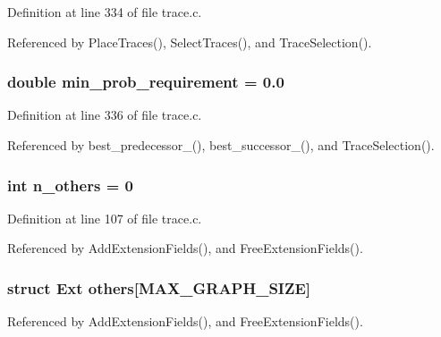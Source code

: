 Definition at line 334 of file trace.c.

Referenced by Place\-Traces(), Select\-Traces(), and Trace\-Selection().
\subsubsection{\setlength{\rightskip}{0pt plus 5cm}double \bf{min\_\-prob\_\-requirement} = 0.0\hspace{0.3cm}{\tt  [static]}}\label{trace_8c_06a8a0cdd51ec843aa04ed331c8cca8e}




Definition at line 336 of file trace.c.

Referenced by best\_\-predecessor\_(), best\_\-successor\_(), and Trace\-Selection().
\subsubsection{\setlength{\rightskip}{0pt plus 5cm}int \bf{n\_\-others} = 0\hspace{0.3cm}{\tt  [static]}}\label{trace_8c_345739fa850c0585c546cf18d1321dfd}




Definition at line 107 of file trace.c.

Referenced by Add\-Extension\-Fields(), and Free\-Extension\-Fields().
\subsubsection{\setlength{\rightskip}{0pt plus 5cm}struct \bf{Ext}
 \bf{others}[MAX\_\-GRAPH\_\-SIZE]\hspace{0.3cm}{\tt  [static]}}\label{trace_8c_de1810b61a32429d7cb869c7a00257a3}




Referenced by Add\-Extension\-Fields(), and Free\-Extension\-Fields().